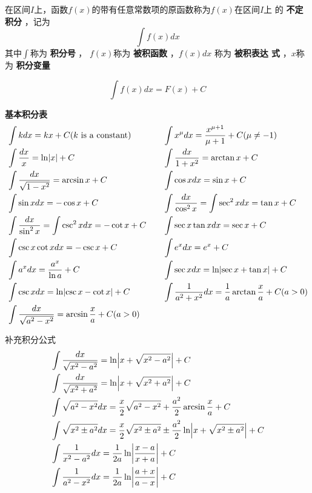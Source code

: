 \documentclass[11pt]{article}
\begin{document}
\begin{definition}[]
在区间\(I\)上，函数\(f(x)\)的带有任意常数项的原函数称为\(f(x)\)在区间\(I\)上
的 \textbf{不定积分} ，记为
\begin{equation*}
\int f(x)dx
\end{equation*}
其中\(\int\)称为 \textbf{积分号} ， \(f(x)\)称为 \textbf{被积函数} ，\(f(x)dx\) 称为 \textbf{被积表达
式} ，\(x\)称为 \textbf{积分变量}
\end{definition}

\begin{equation*}
\int f(x)dx=F(x)+C
\end{equation*}

\textbf{基本积分表}
\begin{alignat*}{2}
&\int kdx=kx+C(k\text{ is a constant})&&
\int x^\mu dx=\frac{x^{\mu+1}}{\mu+1}+C(\mu\neq-1)\\
&\int \frac{dx}{x}=\ln\abs{x}+C&&
\int\frac{dx}{1+x^2}=\arctan x+C\\
&\int\frac{dx}{\sqrt{1-x^2}}=\arcsin x+C&&
\int\cos xdx=\sin x+C\\
&\int \sin xdx=-\cos x+C&&
\int\frac{dx}{\cos^2x}=\int\sec^2xdx=\tan x+C\\
&\int\frac{dx}{\sin^2x}=\int\csc^2xdx=-\cot x+C\quad&&
\int\sec x\tan xdx=\sec x+C\\
&\int\csc x\cot xdx=-\csc x+C&&
\int e^xdx=e^x+C\\
&\int a^xdx=\frac{a^x}{\ln a}+C&&
\int\sec xdx=\ln\abs{\sec x+\tan x}+C\\
&\int\csc xdx=\ln\abs{\csc x-\cot x}+C&&
\int\frac{1}{a^2+x^2}dx=\frac{1}{a}\arctan\frac{x}{a}+C(a>0)\\
&\int\frac{dx}{\sqrt{a^2-x^2}}=\arcsin \frac{x}{a}+C(a>0)
\end{alignat*}

补充积分公式
\begin{align*}
&\int\frac{dx}{\sqrt{x^2-a^2}}=\ln\abs{x+\sqrt{x^2-a^2}}+C\\
&\int\frac{dx}{\sqrt{x^2+a^2}}=\ln\abs{x+\sqrt{x^2+a^2}}+C\\
&\int\sqrt{a^2-x^2}dx=\frac{x}{2}\sqrt{a^2-x^2}+\frac{a^2}{2}\arcsin\frac{x}{a}+C\\
&\int\sqrt{x^2\pm a^2}dx=\frac{x}{2}\sqrt{x^2\pm a^2}\pm
\frac{a^2}{2}\ln\abs{x+\sqrt{x^2\pm a^2}}+C\\
&\int\frac{1}{x^2-a^2}dx=\frac{1}{2a}\ln\abs{\frac{x-a}{x+a}}+C\\
&\int\frac{1}{a^2-x^2}dx=\frac{1}{2a}\ln\abs{\frac{a+x}{a-x}}+C\\
\end{align*}
\end{document}
